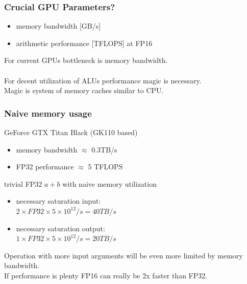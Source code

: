 \documentclass{beamer}
\begin{document}
			\begin{frame}
				\frametitle{Crucial GPU Parameters?}
				\begin{itemize}
                    \item memory bandwidth [GB/s]
					\item arithmetic performance [TFLOPS] at FP16
				\end{itemize}
                
                For current GPUs bottleneck is memory bandwidth.\\~\\
                For decent utilization of ALUs performance magic is necessary.\\
                Magic is system of memory caches similar to CPU.
			\end{frame}
            
            \begin{frame}
                \frametitle{Naive memory usage}
                GeForce GTX Titan Black (GK110 based)
                \begin{itemize}
                    \item memory bandwidth $\approx$ 0.3TB/s
                    \item FP32 performance $\approx$ 5 TFLOPS
				\end{itemize}
                       
                trivial FP32 $a + b$ with naive memory utilization
                \begin{itemize}
                    \item necessary saturation input:\\
                        $2 \times FP32 \times 5 \times 10^{12} /s = 40 TB/s$
                    \item necessary saturation output:\\
                        $1 \times FP32 \times 5 \times 10^{12} /s = 20 TB/s$
                \end{itemize}
                
                Operation with more input arguments will be even more limited by memory bandwidth.\\
                If performance is plenty FP16 can really be 2x faster than FP32.
            \end{frame}
\end{document}
